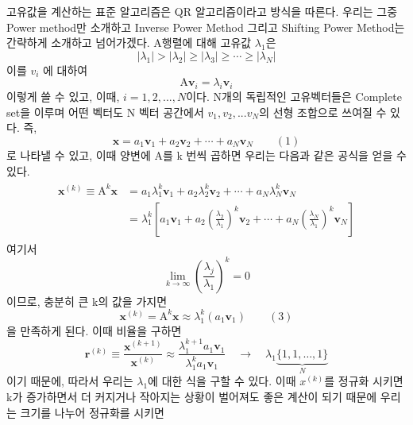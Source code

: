 \documentclass[11pt]{article}
\begin{document}
고유값을 계산하는 표준 알고리즘은 QR 알고리즘이라고 방식을 따른다. 우리는 그중 Power method만 소개하고 Inverse Power Method 그리고 Shifting Power Method는 간략하게 소개하고 넘어가겠다. A행렬에 대해 고유값 $\lambda_1$은 
\begin{equation}
|\lambda_1| > |\lambda_2| \ge |\lambda_3| \ge \cdots \ge |\lambda_N|
\end{equation}
이를 $v_{i}$ 에 대하여 
\begin{equation}
\mathrm A\mathbf v_i = \lambda_i \mathbf v_i
\end{equation}
이렇게 쓸 수 있고, 이때, $i = 1,2,...,N$이다. N개의 독립적인 고유벡터들은 Complete set을 이루며 어떤 벡터도 N 벡터 공간에서 $v_{1},v_{2},...v_{N}$의 선형 조합으로 쓰여질 수 있다.
즉, 
\begin{equation}
\mathbf x = a_1\mathbf v_1 + a_2\mathbf v_2 + \cdots + a_N\mathbf v_N
\qquad (1)
\end{equation}
로 나타낼 수 있고, 이때 양변에 A를 k 번씩 곱하면 우리는 다음과 같은 공식을 얻을 수 있다.
\begin{equation}
\begin{split}
\begin{aligned}
\mathbf x^{(k)} \equiv \mathrm A^k\mathbf x 
&=
a_1\lambda_1^k\mathbf v_1 + a_2\lambda_2^k\mathbf v_2 + \cdots + a_N\lambda_N^k\mathbf v_N
\\
&=
\lambda_1^k \left[
a_1\mathbf v_1 + a_2\left(\frac{\lambda_2}{\lambda_1}\right)^k\mathbf v_2 + \cdots + a_N\left(\frac{\lambda_N}{\lambda_1}\right)^k\mathbf v_N
\right]
\end{aligned}
\end{split}
\end{equation}
여기서 
\begin{equation}
\lim_{k \rightarrow \infty}\left(\frac{\lambda_j}{\lambda_1}\right)^k = 0
\end{equation}
이므로, 충분히 큰 k의 값을 가지면
\begin{equation}
\mathbf x^{(k)} = \mathrm A^k\mathbf x \approx \lambda_1^k (a_1 \mathbf v_1)
\qquad (3)
\end{equation}
을 만족하게 된다. 이때 비율을 구하면
\begin{equation}
\mathbf r^{(k)} \equiv \frac{\mathbf x^{(k + 1)}}{\mathbf x^{(k)}}
\approx \frac{\lambda_1^{k + 1} a_1 \mathbf v_1}{\lambda_1^{k} a_1 \mathbf v_1}
\quad\rightarrow\quad
\lambda_1 \underbrace{\{1, 1, \dots, 1\}}_{N}
\end{equation}
이기 때문에, 따라서 우리는 $\lambda_{1}$에 대한 식을 구할 수 있다. 이때 $x^{(k)}$를 정규화 시키면 k가 증가하면서 더 커지거나 작아지는 상황이 벌어져도 좋은 계산이 되기 때문에 우리는 크기를 나누어 정규화를 시키면
\end{document}
